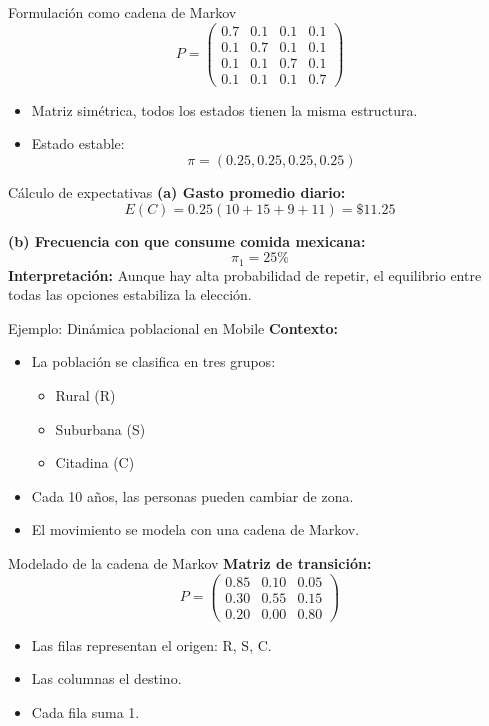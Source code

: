 \documentclass{beamer}
\begin{document}
\begin{frame}{Formulación como cadena de Markov}
\[
P = 
\begin{pmatrix}
0.7 & 0.1 & 0.1 & 0.1 \\
0.1 & 0.7 & 0.1 & 0.1 \\
0.1 & 0.1 & 0.7 & 0.1 \\
0.1 & 0.1 & 0.1 & 0.7
\end{pmatrix}
\]
\begin{itemize}
  \item Matriz simétrica, todos los estados tienen la misma estructura.
  \item Estado estable:
  \[
  \pi = (0.25, 0.25, 0.25, 0.25)
  \]
\end{itemize}
\end{frame}

\begin{frame}{Cálculo de expectativas}
\textbf{(a) Gasto promedio diario:}
\[
E(C) = 0.25(10 + 15 + 9 + 11) = \boxed{\$11.25}
\]

\textbf{(b) Frecuencia con que consume comida mexicana:}
\[
\pi_1 = \boxed{25\%}
\]
\textbf{Interpretación:} Aunque hay alta probabilidad de repetir, el equilibrio entre todas las opciones estabiliza la elección.
\end{frame}

\begin{frame}{Ejemplo: Dinámica poblacional en Mobile}
\textbf{Contexto:}
\begin{itemize}
  \item La población se clasifica en tres grupos:
  \begin{itemize}
    \item Rural (R)
    \item Suburbana (S)
    \item Citadina (C)
  \end{itemize}
  \item Cada 10 años, las personas pueden cambiar de zona.
  \item El movimiento se modela con una cadena de Markov.
\end{itemize}
\end{frame}

\begin{frame}{Modelado de la cadena de Markov}
\textbf{Matriz de transición:}
\[
P =
\begin{pmatrix}
0.85 & 0.10 & 0.05 \\
0.30 & 0.55 & 0.15 \\
0.20 & 0.00 & 0.80
\end{pmatrix}
\]
\begin{itemize}
  \item Las filas representan el origen: R, S, C.
  \item Las columnas el destino.
  \item Cada fila suma 1.
\end{itemize}
\end{frame}
\end{document}
